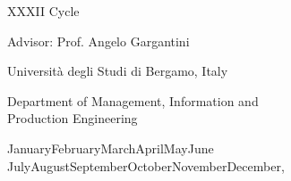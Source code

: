 \documentclass[
12pt, %
oneside, %
english, %
singlespacing, %
headsepline, %
consistentlayout, %
]{MastersDoctoralThesis} %
\theoremstyle{plain}
\theoremstyle{definition}
\theoremstyle{remark}
\theoremstyle{plain}
\theoremstyle{plain}
\theoremstyle{remark}
\begin{document}
\begin{titlepage}
\begin{center}
	XXXII Cycle
    
    \vspace{\fill}
    
    {\large Advisor: Prof. Angelo Gargantini \\}
    
   
    
    \vspace{0.3cm}
    
    \vspace{\fill}
    
    {\large Universit\`a degli Studi di Bergamo, Italy
    
   Department of Management, Information and \\Production Engineering\\}
    
    \vspace{.5cm}
    
    {\large
    	\ifcase\month\or
    	January\or February\or March\or April\or May\or June\or
    	July\or August\or September\or October\or November\or December\fi,
    	\number\year
    }
    
   
    
    
    
  \end{center}
\end{titlepage}



\clearpage

\end{document}
